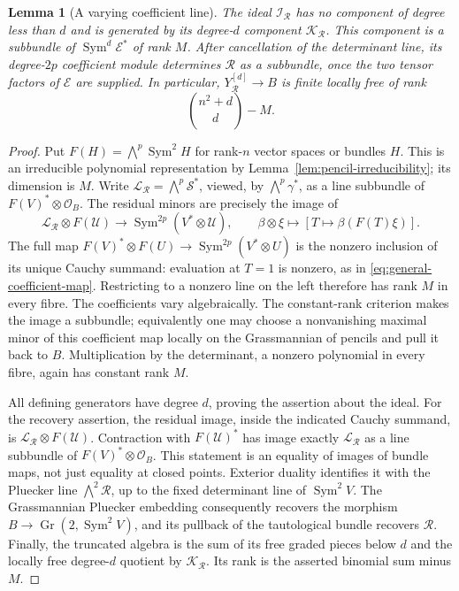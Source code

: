 \documentclass[11pt,reqno]{amsart}
\numberwithin{equation}{section}
\newtheorem{lemma}[theorem]{Lemma}
\theoremstyle{definition}\newtheorem{definition}[theorem]{Definition}
\theoremstyle{remark}\newtheorem{remark}[theorem]{Remark}
\newcommand{\OO}{\mathcal O}\newcommand{\II}{\mathcal I}
\DeclareMathOperator{\Sym}{Sym}\DeclareMathOperator{\Gr}{Gr}
\begin{document}
\begin{lemma}[A varying coefficient line]\label{lem:moving-coefficients-v146}
The ideal \(\mathcal I_{\mathcal R}\) has no component of degree less
than \(d\) and is generated by its degree-\(d\) component
\(\mathcal K_{\mathcal R}\).  This component is a subbundle of
\(\Sym^d\mathcal E^*\) of rank \(M\).  After cancellation of the
determinant line, its degree-\(2p\) coefficient module determines
\(\mathcal R\) as a subbundle, once the two tensor factors of
\(\mathcal E\) are supplied.  In particular,
\(Y_{\mathcal R}^{[d]}\to B\) is finite locally free of rank
\[
                   \binom{n^2+d}{d}-M.
\]
\end{lemma}
\begin{proof}
Put \(F(H)=\bigwedge^p\Sym^2H\) for rank-\(n\) vector spaces or
bundles \(H\).  This is an irreducible polynomial representation by
Lemma~\ref{lem:pencil-irreducibility}; its dimension is \(M\).  Write
\(\mathcal L_{\mathcal R}=\bigwedge^p\mathcal S^*\), viewed, by
\(\bigwedge^p\gamma^*\), as a line subbundle of
\(F(V)^*\otimes\OO_B\).  The residual minors are precisely the image of
\begin{equation}\label{eq:moving-coefficient-map-v146}
 \mathcal L_{\mathcal R}\otimes F(\mathcal U)
  \longrightarrow \Sym^{2p}(V^*\otimes\mathcal U),\qquad
 \beta\otimes\xi\longmapsto[T\mapsto\beta(F(T)\xi)].
\end{equation}
The full map \(F(V)^*\otimes F(U)\to
\Sym^{2p}(V^*\otimes U)\) is the nonzero inclusion of its unique
Cauchy summand: evaluation at \(T=1\) is nonzero, as in
\eqref{eq:general-coefficient-map}.  Restricting to a nonzero line on
the left therefore has rank \(M\) in every fibre.  The coefficients
vary algebraically.  The constant-rank criterion makes the image a
subbundle; equivalently one may choose a nonvanishing maximal minor
of this coefficient map locally on the Grassmannian of pencils and
pull it back to \(B\).  Multiplication by the determinant, a nonzero
polynomial in every fibre, again has constant rank \(M\).

All defining generators have degree \(d\), proving the assertion
about the ideal.  For the recovery assertion, the residual image,
inside the indicated Cauchy summand, is
\(\mathcal L_{\mathcal R}\otimes F(\mathcal U)\).  Contraction with
\(F(\mathcal U)^*\) has image exactly \(\mathcal L_{\mathcal R}\)
as a line subbundle of \(F(V)^*\otimes\OO_B\).  This statement is an
equality of images of bundle maps, not just equality at closed points.
Exterior duality identifies it with the Pluecker line
\(\bigwedge^2\mathcal R\), up to the fixed determinant line of
\(\Sym^2V\).  The Grassmannian Pluecker embedding consequently
recovers the morphism \(B\to\Gr(2,\Sym^2V)\), and its pullback
of the tautological bundle recovers \(\mathcal R\).
Finally, the truncated algebra is the sum of its free graded pieces
below \(d\) and the locally free degree-\(d\) quotient by
\(\mathcal K_{\mathcal R}\).  Its rank is the asserted binomial sum
minus \(M\).
\end{proof}
\end{document}
